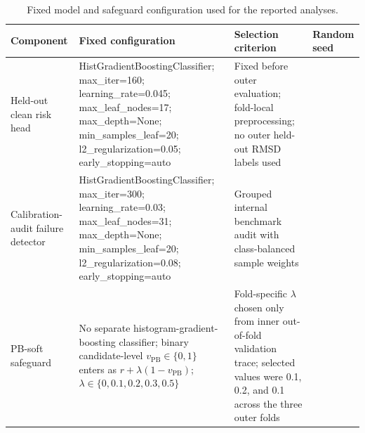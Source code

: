 \begin{table}[!ht]
\centering
\caption{Fixed model and safeguard configuration used for the reported analyses.}
\label{tab:s_hyperparams}
\footnotesize
\setlength{\tabcolsep}{3pt}
\begin{tabular}{>{\raggedright\arraybackslash}p{}>{\raggedright\arraybackslash}p{}>{\raggedright\arraybackslash}p{}>{\raggedright\arraybackslash}p{}}
\toprule
Component & Fixed configuration & Selection criterion & Random seed \\
\midrule
Held-out clean risk head & HistGradientBoostingClassifier; max\_iter=160; learning\_rate=0.045; max\_leaf\_nodes=17; max\_depth=None; min\_samples\_leaf=20; l2\_regularization=0.05; early\_stopping=auto & Fixed before outer evaluation; fold-local preprocessing; no outer held-out RMSD labels used & 20260808 \\
Calibration-audit failure detector & HistGradientBoostingClassifier; max\_iter=300; learning\_rate=0.03; max\_leaf\_nodes=31; max\_depth=None; min\_samples\_leaf=20; l2\_regularization=0.08; early\_stopping=auto & Grouped internal benchmark audit with class-balanced sample weights & 20260726 \\
PB-soft safeguard & No separate histogram-gradient-boosting classifier; binary candidate-level $v_{\mathrm{PB}}\in\{0,1\}$ enters as $r+\lambda(1-v_{\mathrm{PB}})$; $\lambda\in\{0,0.1,0.2,0.3,0.5\}$ & Fold-specific $\lambda$ chosen only from inner out-of-fold validation trace; selected values were 0.1, 0.2, and 0.1 across the three outer folds & 20260808 \\
\bottomrule
\end{tabular}
\end{table}
